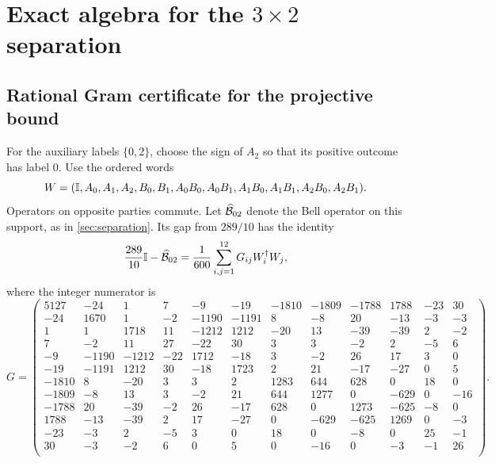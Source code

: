 \section[Exact algebra for the 3-by-2 separation]
{Exact algebra for the \(3\times2\) separation}
\label{app:separation-algebra}

\subsection{Rational Gram certificate for the projective bound}
\label{app:sos-gram}

For the auxiliary labels \(\{0,2\}\), choose the sign of \(A_2\) so that
its positive outcome has label \(0\). Use the ordered words
\[
W=(\mathbb I,A_0,A_1,A_2,B_0,B_1,A_0B_0,A_0B_1,A_1B_0,A_1B_1,A_2B_0,A_2B_1).
\]
Operators on opposite parties commute. Let \(\widehat{\mathcal B}_{02}\) denote the
Bell operator on this support, as in \cref{sec:separation}. Its gap from
\(289/10\) has the identity
\[
\frac{289}{10}\mathbb I-\widehat{\mathcal B}_{02}
 =\frac{1}{600}\sum_{i,j=1}^{12}G_{ij} W_i^\dagger W_j ,
\]
where the integer numerator is
\begingroup
\small
\setlength{\arraycolsep}{2pt}
\[
G=\left(\begin{array}{*{12}{r}}
5127 & -24 & 1 & 7 & -9 & -19 & -1810 & -1809 & -1788 & 1788 & -23 & 30 \\
-24 & 1670 & 1 & -2 & -1190 & -1191 & 8 & -8 & 20 & -13 & -3 & -3 \\
1 & 1 & 1718 & 11 & -1212 & 1212 & -20 & 13 & -39 & -39 & 2 & -2 \\
7 & -2 & 11 & 27 & -22 & 30 & 3 & 3 & -2 & 2 & -5 & 6 \\
-9 & -1190 & -1212 & -22 & 1712 & -18 & 3 & -2 & 26 & 17 & 3 & 0 \\
-19 & -1191 & 1212 & 30 & -18 & 1723 & 2 & 21 & -17 & -27 & 0 & 5 \\
-1810 & 8 & -20 & 3 & 3 & 2 & 1283 & 644 & 628 & 0 & 18 & 0 \\
-1809 & -8 & 13 & 3 & -2 & 21 & 644 & 1277 & 0 & -629 & 0 & -16 \\
-1788 & 20 & -39 & -2 & 26 & -17 & 628 & 0 & 1273 & -625 & -8 & 0 \\
1788 & -13 & -39 & 2 & 17 & -27 & 0 & -629 & -625 & 1269 & 0 & -3 \\
-23 & -3 & 2 & -5 & 3 & 0 & 18 & 0 & -8 & 0 & 25 & -1 \\
30 & -3 & -2 & 6 & 0 & 5 & 0 & -16 & 0 & -3 & -1 & 26 \\
\end{array}\right).
\]
\endgroup
